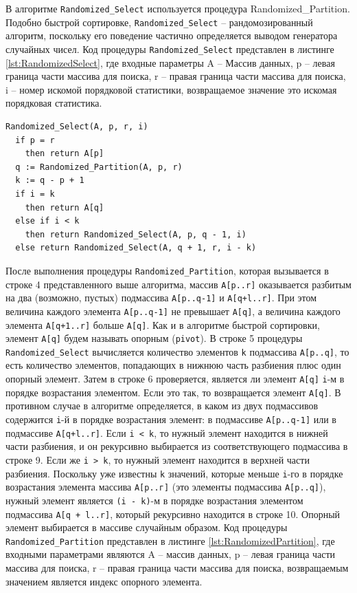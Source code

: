 В алгоритме \texttt{Randomized\_Select} используется процедура Randomized\_Partition. 
Подобно быстрой сортировке, \texttt{Randomized\_Select} – рандомозированный алгоритм, 
поскольку его поведение частично определяется выводом генератора случайных чисел. 
Код процедуры \texttt{Randomized\_Select} представлен в листинге \ref{lst:RandomizedSelect}, где входные параметры A – Массив данных,
p – левая граница части массива для поиска,
r – правая граница части массива для поиска,
i – номер искомой порядковой статистики, возвращаемое значение это искомая порядковая статистика.

        
\begin{lstlisting}[style=pseudocode,caption={Код процедуры Randomized\_Select},label=lst:RandomizedSelect]
Randomized_Select(A, p, r, i) 
  if p = r 
    then return A[p] 
  q := Randomized_Partition(A, p, r) 
  k := q - p + 1
  if i = k
    then return A[q]
  else if i < k
    then return Randomized_Select(A, p, q - 1, i)
  else return Randomized_Select(A, q + 1, r, i - k)
\end{lstlisting}
        
После выполнения процедуры \texttt{Randomized\_Partition}, которая вызывается  в строке 4 
представленного выше алгоритма, массив \texttt{А[р..r]} оказывается разбитым на два (возможно, пустых) 
подмассива \texttt{A[p..q-1]} и \texttt{A[q+l..r]}. При этом величина каждого элемента \texttt{A[p..q-1]} не превышает 
\texttt{A[q]}, а величина каждого элемента \texttt{А[q+1..r]} больше \texttt{A[q]}. 
Как и в алгоритме быстрой сортировки, элемент \texttt{A[q]} будем называть опорным (\texttt{pivot}). 
В строке 5 процедуры \texttt{Randomized\_Select} вычисляется количество элементов \texttt{k} подмассива \texttt{А[p..q]}, 
то есть количество элементов, попадающих в нижнюю часть разбиения плюс один опорный элемент. 
Затем в строке 6 проверяется, является ли элемент \texttt{A[q]} \texttt{i}-м в порядке возрастания элементом. 
Если это так, то возвращается элемент \texttt{A[q]}. В противном случае в алгоритме определяется, в 
каком из двух подмассивов содержится \texttt{i}-й в порядке возрастания элемент: в подмассиве \texttt{A[p..q-1]} 
или в подмассиве \texttt{A[q+l..r]}. Если \texttt{i < k}, то нужный элемент находится в нижней части разбиения, 
и он рекурсивно выбирается из соответствующего подмассива в строке 9. Если же \texttt{i > k}, то нужный элемент 
находится в верхней части разбиения. Поскольку уже известны \texttt{k} значений, которые меньше \texttt{i}-го в 
порядке возрастания элемента массива \texttt{А[р..г]} (это элементы подмассива \texttt{A[p..q]}), 
нужный элемент является \texttt{(i - k)}-м в порядке возрастания элементом подмассива \texttt{A[q + l..r]}, который рекурсивно находится в строке 10.
Опорный элемент выбирается в массиве случайным образом. Код процедуры \texttt{Randomized\_Partition} представлен в листинге \ref{lst:RandomizedPartition}, 
где входными параметрами являются A – массив данных, p – левая граница части массива для поиска, r – правая граница части массива для поиска,
возвращаемым значением является индекс опорного элемента.
 
